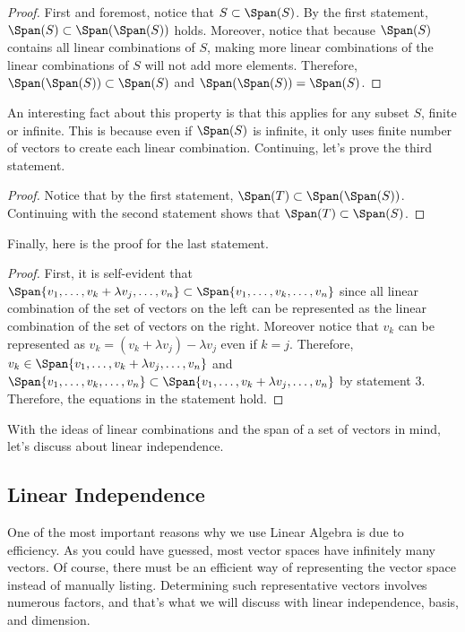 \documentclass[../main.tex]{subfiles}
\begin{document}
\begin{proof}
First and foremost, notice that $S \subset \Span(S)$. By the first
statement, $\Span(S) \subset \Span(\Span(S))$ holds. Moreover,
notice that because $\Span(S)$ contains all linear combinations of
$S$, making more linear combinations of the linear combinations of
$S$ will not add more elements. Therefore, $\Span(\Span(S)) \subset
\Span(S)$ and $\Span(\Span(S)) = \Span(S)$.
\end{proof}

An interesting fact about this property is that this applies for
any subset $S$, finite or infinite. This is because even if $\Span(S)$
is infinite, it only uses finite number of vectors to create
each linear combination. Continuing, let's prove the third statement.

\begin{proof}
Notice that by the first statement, $\Span(T) \subset
\Span(\Span(S))$. Continuing with the second statement shows that
$\Span(T) \subset \Span(S)$.
\end{proof}

Finally, here is the proof for the last statement.

\begin{proof}
First, it is self-evident that $\Span\{ v_1, \ldots, v_k
+ \lambda v_j, \ldots, v_n \} \subset \Span\{ v_1, \linebreak \ldots,
v_k, \ldots, v_n \}$ since all linear combination of the set of
vectors on the left can be represented as the linear combination of
the set of vectors on the right. Moreover notice that $v_k$ can be
represented as $v_k = (v_k + \lambda v_j) - \lambda v_j$ even if
$k = j$. Therefore, $v_k \in \Span\{ v_1, \ldots, v_k + \lambda v_j,
\ldots, v_n \}$ and $\Span\{ v_1, \ldots, v_k, \ldots, v_n \} \subset
\Span\{ v_1, \ldots, v_k + \lambda v_j, \linebreak \ldots, v_n \}$ by
statement 3. Therefore, the equations in the statement hold.
\end{proof}

With the ideas of linear combinations and the span of a set of vectors
in mind, let's discuss about linear independence.

\subsection{Linear Independence}

One of the most important reasons why we use Linear Algebra is due to
efficiency. As you could have guessed, most vector spaces have
infinitely many vectors. Of course, there must be an efficient way
of representing the vector space instead of manually listing.
Determining such representative vectors involves numerous factors,
and that's what we will discuss with linear independence, basis,
and dimension.
\end{document}
